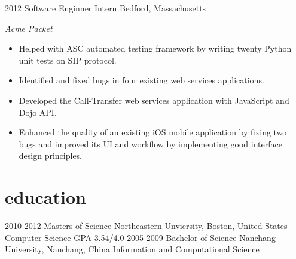 \documentclass[]{ly-cv} %
\begin{document}
\begin{entrylist}
\entry
{2012}
{Software Enginner Intern}
{Bedford, Massachusetts}
{\emph{Acme Packet}
\begin{itemize}
  \item Helped with ASC automated testing framework by writing twenty Python unit tests on SIP protocol.
	\item Identified and fixed bugs in four existing web services applications.
  \item Developed the Call-Transfer web services application with JavaScript and Dojo API.
  \item Enhanced the quality of an existing iOS mobile application by fixing two bugs and improved its UI and workflow by implementing good interface design principles.
\end{itemize}}
\end{entrylist}
\section{education}
\begin{entrylist}
\entry
{2010-2012}
{Masters of Science} 
{Northeastern Unviersity, Boston, United States}
{Computer Science \hspace{4mm} \footnotesize{GPA 3.54/4.0}}
\entry
{2005-2009}
{Bachelor of Science}
{Nanchang University, Nanchang, China} 
{Information and Computational Science}
\end{entrylist}
\end{document}
